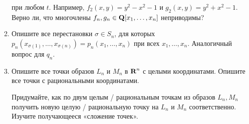 \begin{enumerate}
при любом $t$. Например, $f_2(x,y) = y^2 - x^2 - 1$ и $g_2(x,y) = y^2 + x^2 - 1$. Верно ли, что многочлены $f_n, g_n \in \text{\bfseries Q}[x_1, \ldots, x_n]$ неприводимы?

\item Опишите все перестановки $\sigma \in S_n$, для которых $p_n(x_{\sigma(1)}, \ldots, x_{\sigma(n)}) = p_n(x_1, \ldots, x_n)$ при всех $x_1, \ldots, x_n$. Аналогичный вопрос для $q_n$.

\item 
Опишите все точки образов $L_n$ и $M_n$ в $\text{\bfseries R}^n$ с целыми координатами. Опишите все точки с рациональными координатами.

Придумайте, как по двум целым / рациональным точкам из образов $L_n, M_n$ получить новую целую / рациональную точку на $L_n$ и $M_n$ соответственно. Изучите получающееся «сложение точек».
\end{enumerate}